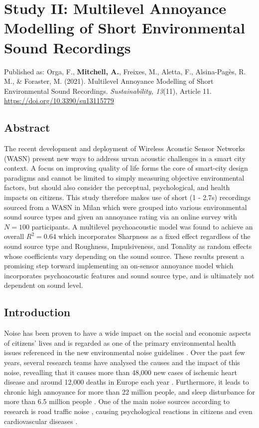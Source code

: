 \chapter[Study II: Multilevel Annoyance Modelling]{Study II: Multilevel Annoyance Modelling of Short Environmental Sound Recordings}

Published as: Orga, F., \textbf{Mitchell, A.}, Freixes, M., Aletta, F., Alsina-Pagès, R. M., \& Foraster, M. (2021). Multilevel Annoyance Modelling of Short Environmental Sound Recordings. \emph{Sustainability, 13}(11), Article 11. \url{https://doi.org/10.3390/su13115779}


\section*{Abstract}

 The recent development and deployment of Wireless Acoustic Sensor Networks (WASN) present new ways to address urvan acoustic challenges in a smart city context. A focus on improving quality of life forms the core of smart-city design paradigms and cannot be limited to simply measuring objective environmental factors, but should also consider the perceptual, psychological, and health impacts on citizens. This study therefore makes use of short (1 - 2.7s) recordings sourced from a WASN in Milan which were grouped into various environmental sound source types and given an annoyance rating via an online survey with $N=100$ participants. A multilevel psychoacoustic model was found to achieve an overall $R^2=0.64$ which incorporates Sharpness as a fixed effect regardless of the sound source type and Roughness, Impulsiveness, and Tonality as random effects whose coefficients vary depending on the sound source. These results present a promising step torward implementing an on-sensor annoyance model which incorporates psychoacoustic features and sound source type, and is ultimately not dependent on sound level.

\section{Introduction}

 Noise has been proven to have a wide impact on the social and economic aspects of citizens' lives \citep{Goines2007Noise} and is regarded as one of the primary environmental health issues referenced in the new environmental noise guidelines \citep{Nations2018World}. Over the past few years, several research teams have analysed the causes and the impact of this noise, revealling that it causes more than 48,000 new cases of ischemic heart disease and around 12,000 deaths in Europe each year \citep{Blanes2017Noise}. Furthermore, it leads to chronic high annoyance for more than 22 million people, and sleep disturbance for more than 6.5 million people \citep{Ndrepepa2011Relationship}. One of the main noise sources according to research is road traffic noise \citep{Ouis2001Annoyance}, causing psychological reactions in citizens \citet{Basner2006Aircraft} and even cardiovascular diseases \citep{Ndrepepa2011Relationship}.

